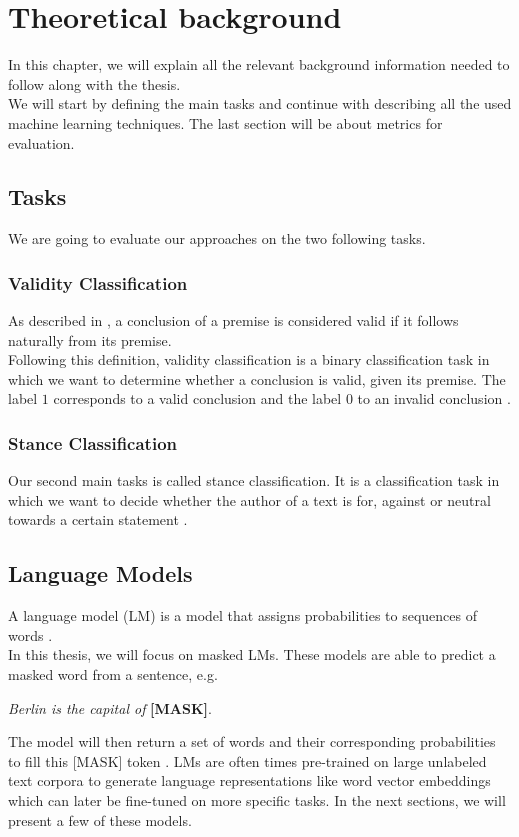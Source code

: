 \section{Theoretical background}
In this chapter, we will explain all the relevant background information needed to follow along with the thesis. \\
We will start by defining the main tasks and continue with describing all the used machine learning techniques. The last section will be about metrics for evaluation.

\subsection{Tasks}
We are going to evaluate our approaches on the two following tasks.

\subsubsection{Validity Classification}
As described in \cite{argsvalidnovel2022}, a conclusion of a premise is considered valid if it follows naturally from its premise. \\
Following this definition, validity classification is a binary classification task in which we want to determine whether a conclusion is valid, given its premise. The label $1$ corresponds to a valid conclusion and the label $0$ to an invalid conclusion \cite{argsvalidnovel2022}.

\subsubsection{Stance Classification}
Our second main tasks is called stance classification. It is a classification task in which we want to decide whether the author of a text is for, against or neutral towards a certain statement \cite{mohammad2017stance}.

\subsection{Language Models}
A language model (LM) is a model that assigns probabilities to sequences of words \cite{languagemodels2023}. \\
In this thesis, we will focus on masked LMs. These models are able to predict a masked word from a sentence, e.g.
\begin{center}
	\textit{Berlin is the capital of} \textbf{[MASK]}.
\end{center}
The model will then return a set of words and their corresponding probabilities to fill this [MASK] token \cite{bert}. LMs are often times pre-trained on large unlabeled text corpora to generate language representations like word vector embeddings which can later be fine-tuned on more specific tasks. In the next sections, we will present a few of these models.


